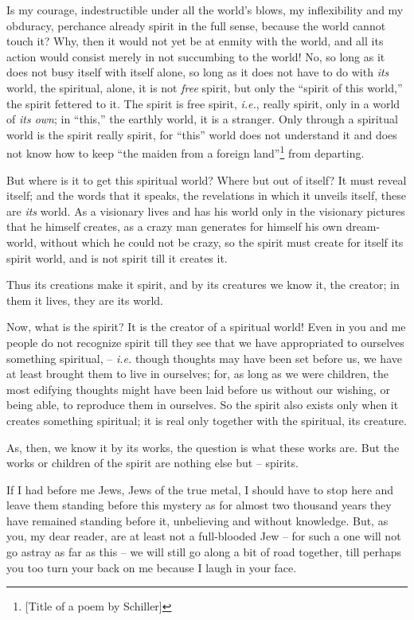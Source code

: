 Is my courage, indestructible under all the world's blows, my inflexibility 
and my obduracy, perchance already spirit in the full sense, because the world 
cannot touch it? Why, then it would not yet be at enmity with the world, and 
all its action would consist merely in not succumbing to the world! No, so 
long as it does not busy itself with itself alone, so long as it does not have 
to do with \textit{its} world, the spiritual, alone, it is not \textit{free} 
spirit, but only the ``spirit of this world,'' the spirit fettered to it. 
The spirit is free spirit, \textit{i.e.}, really spirit, only in a world of 
\textit{its own}; in ``this,'' the earthly world, it is a stranger. Only 
through a spiritual world is the spirit really spirit, for ``this'' world 
does not understand it and does not know how to keep ``the maiden from a 
foreign land''\footnote{[Title of a poem by Schiller]} from departing.

But where is it to get this spiritual world? Where but out of itself? It must 
reveal itself; and the words that it speaks, the revelations in which it 
unveils itself, these are \textit{its} world. As a visionary lives and has his 
world only in the visionary pictures that he himself creates, as a crazy man 
generates for himself his own dream-world, without which he could not be 
crazy, so the spirit must create for itself its spirit world, and is not 
spirit till it creates it.

Thus its creations make it spirit, and by its creatures we know it, the 
creator; in them it lives, they are its world.

Now, what is the spirit? It is the creator of a spiritual world! Even in you 
and me people do not recognize spirit till they see that we have appropriated 
to ourselves something spiritual, -- \textit{i.e.} though thoughts may have 
been set before us, we have at least brought them to live in ourselves; for, 
as long as we were children, the most edifying thoughts might have been laid 
before us without our wishing, or being able, to reproduce them in ourselves. 
So the spirit also exists only when it creates something spiritual; it is real 
only together with the spiritual, its creature.

As, then, we know it by its works, the question is what these works are. But 
the works or children of the spirit are nothing else but -- spirits.

If I had before me Jews, Jews of the true metal, I should have to stop here 
and leave them standing before this mystery as for almost two thousand years 
they have remained standing before it, unbelieving and without knowledge. But, 
as you, my dear reader, are at least not a full-blooded Jew -- for such a one 
will not go astray as far as this -- we will still go along a bit of road 
together, till perhaps you too turn your back on me because I laugh in your 
face.

